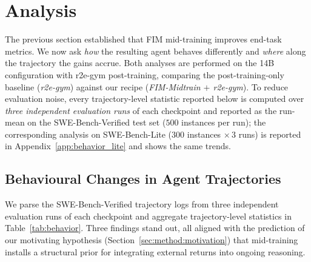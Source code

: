 
\section{Analysis}
\label{sec:analysis}

The previous section established that FIM mid-training improves end-task
metrics. We now ask \emph{how} the resulting agent behaves differently and
\emph{where} along the trajectory the gains accrue. Both analyses are
performed on the 14B configuration with r2e-gym post-training, comparing the
post-training-only baseline (\emph{r2e-gym}) against our recipe
(\emph{FIM-Midtrain $+$ r2e-gym}). To reduce evaluation noise, every
trajectory-level statistic reported below is computed over \emph{three
independent evaluation runs} of each checkpoint and reported as the run-mean
on the SWE-Bench-Verified test set ($500$ instances per run); the
corresponding analysis on SWE-Bench-Lite ($300$ instances $\times\,3$ runs)
is reported in Appendix~\ref{app:behavior_lite} and shows the same trends.


\subsection{Behavioural Changes in Agent Trajectories}
\label{sec:analysis:behavior}

We parse the SWE-Bench-Verified trajectory logs from three independent
evaluation runs of each checkpoint and aggregate trajectory-level statistics
in Table~\ref{tab:behavior}. Three findings stand out, all aligned with the
prediction of our motivating hypothesis (Section~\ref{sec:method:motivation})
that mid-training installs a structural prior for integrating external
returns into ongoing reasoning.

